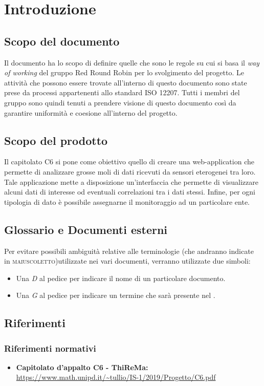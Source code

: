 \section{Introduzione}
	\subsection{Scopo del documento}
		Il documento ha lo scopo di definire quelle che sono le regole su cui si basa il \textit{way of working} del gruppo Red Round Robin per lo svolgimento del progetto. Le attività che possono essere trovate all'interno di questo documento sono state prese da processi appartenenti allo standard ISO 12207. Tutti i membri del gruppo sono quindi tenuti a prendere visione di questo documento così da garantire uniformità e coesione all'interno del progetto.   
	\subsection{Scopo del prodotto}
		Il capitolato C6 si pone come obiettivo quello di creare una web-application che permette di analizzare grosse moli di dati ricevuti da sensori eterogenei tra loro. Tale applicazione mette a disposizione un'interfaccia che permette di visualizzare alcuni dati di interesse od eventuali correlazioni tra i dati stessi. Infine, per ogni tipologia di dato è possibile assegnarne il monitoraggio ad un particolare ente. 
	\subsection{Glossario e Documenti esterni}
		Per evitare possibili ambiguità relative alle terminologie (che andranno indicate in \textsc{maiuscoletto})utilizzate nei vari documenti, verranno utilizzate due simboli:
		\begin{itemize}
			\item Una \textit{D} al pedice per indicare il nome di un particolare documento.
			\item Una \textit{G} al pedice per indicare un termine che sarà 
			presente nel .
		\end{itemize}
	\subsection{Riferimenti}

		\subsubsection{Riferimenti normativi}
			\begin{itemize}
				\item \textbf{Capitolato d'appalto C6 - ThiReMa: } 
				\url{https://www.math.unipd.it/~tullio/IS-1/2019/Progetto/C6.pdf}
			\end{itemize}	
